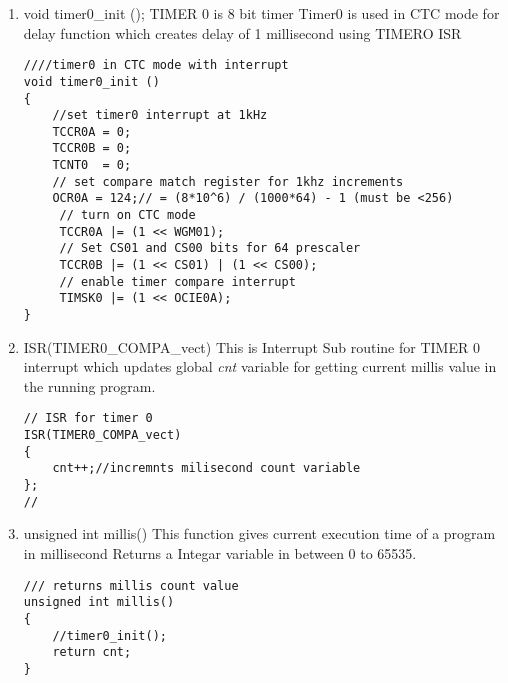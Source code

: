 \documentclass{article}
\begin{document}
\begin{itemize}
\begin{enumerate}
\item void timer0\_init ();
\newline TIMER 0 is 8 bit timer 
\newline Timer0 is used in CTC mode for delay function which creates delay of 1 millisecond using TIMERO ISR
\begin{lstlisting}
////timer0 in CTC mode with interrupt 
void timer0_init ()
{
	//set timer0 interrupt at 1kHz
	TCCR0A = 0;
	TCCR0B = 0;
	TCNT0  = 0;
	// set compare match register for 1khz increments
	OCR0A = 124;// = (8*10^6) / (1000*64) - 1 (must be <256)
	 // turn on CTC mode
	 TCCR0A |= (1 << WGM01);
	 // Set CS01 and CS00 bits for 64 prescaler
	 TCCR0B |= (1 << CS01) | (1 << CS00);
	 // enable timer compare interrupt
	 TIMSK0 |= (1 << OCIE0A);
}
\end{lstlisting}
\item 
ISR(TIMER0\_COMPA\_vect)
\newline This is Interrupt Sub routine for
TIMER 0 interrupt which updates global \textit{cnt} variable for getting current millis value in the running program.
\begin{lstlisting}
// ISR for timer 0
ISR(TIMER0_COMPA_vect)
{
	cnt++;//incremnts milisecond count variable
};
//
\end{lstlisting}
\item unsigned int millis()
\newline This function gives current execution time of a program in millisecond \newline Returns a  Integar variable in between 0 to 65535.
\begin{lstlisting}
/// returns millis count value
unsigned int millis()
{
	//timer0_init();
	return cnt;
}
\end{lstlisting}


\end{enumerate}
\end{itemize}
\end{document}
